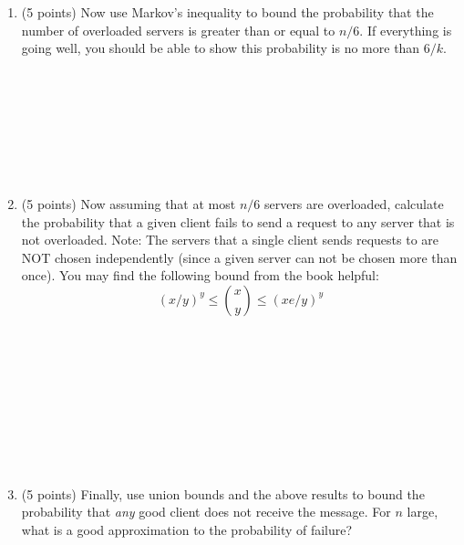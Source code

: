 \documentclass[11pt]{article}
\newcommand{\ans}[1]{ }
\begin{document}
\begin{enumerate}
\begin{enumerate}
\item (5 points) Now use Markov's inequality to bound the probability that the number of overloaded servers is greater than or equal to $n/6$.  If everything is going well, you should be able to show this probability is no more than $6/k$.
\ans{Let $X$ be the number of overloaded servers.  By Markov's, $Pr(X \geq \lambda) \leq E(X)/\lambda$, which means $Pr(X \geq n/6) \leq (n/k)/(n/6) = 6/k$.} \\ \ \\ \ \\ \ \\ \ \\ \ \\ \ \\ \ \\


\pagebreak

\item (5 points) Now assuming that at most $n/6$ servers are overloaded, calculate the probability that a given client fails to send a request to any server that is not overloaded.  Note: The servers that a single client sends requests to are NOT chosen independently (since a given server can not be chosen more than once).  You may find the following bound from the book helpful: 
$$ (x/y)^{y} \leq {x \choose y} \leq (xe/y)^{y}$$

\ans{The probability of sending every request to a server that is overloaded is ${n/6 \choose \sqrt{n}} / {n \choose \sqrt{n}}$.  Using the above inequality, this probability is no more than $(e/6)^{\sqrt{n}} \leq (1/2)^{\sqrt{n}}$} \ \\ \ \\ \ \\ \ \\ \ \\ \ \\ \ \\ \ \\

\pagebreak

\item (5 points) Finally, use union bounds and the above results to bound the probability that \emph{any} good client does not receive the message.  For $n$ large, what is a good approximation to the probability of failure?


\end{enumerate}
\end{enumerate}
\end{document}
